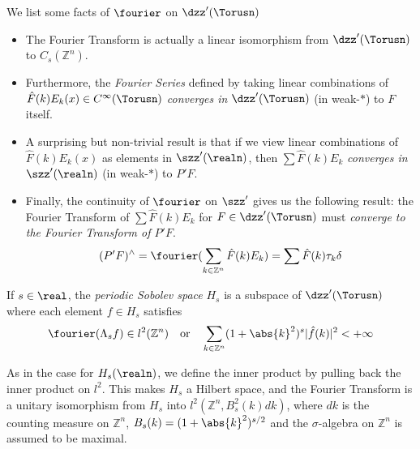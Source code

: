 \documentclass[../main-v2-manifolds.tex]{subfiles}
\begin{document}
We list some facts of $\fourier$ on $\dzz'(\Torusn)$
\begin{itemize}
    \item The Fourier Transform is actually a linear isomorphism from $\dzz'(\Torusn)$ to $C_s(\mathbb{Z}^n)$. 

    \item Furthermore, the \emph{Fourier Series} defined by taking linear combinations of $\hat{F}(k)E_k(x)\in C^\infty(\Torusn)$ \emph{converges in $\dzz'(\Torusn)$} (in weak-$\ast$) to $F$ itself. 
    
    \item A surprising but non-trivial result is that if we view linear combinations of $\hat{F}(k)E_k(x)$ as elements in $\szz'(\realn)$, then $\sum \hat{F}(k)E_k$ \emph{converges in $\szz'(\realn)$} (in weak-$\ast$) to $P'F$.
    
    \item Finally, the continuity of $\fourier$ on $\szz'$ gives us the following result: the Fourier Transform of $\sum \hat{F}(k)E_k$ for $F\in \dzz'(\Torusn)$ must \emph{converge to the Fourier Transform of $P'F$}. 
    \[
    (P'F)^{\wedge} = \fourier(\sum_{k\in\mathbb{Z}^n} \hat{F}(k)E_k) = \sum \hat{F}(k)\tau_k\delta
    \]
\end{itemize}


\begin{definition}\label{def:periodic l2 sobolev space}
If $s\in\real$, the \emph{periodic Sobolev space} $H_s$ is a subspace of $\dzz'(\Torusn)$ where each element $f\in H_s$ satisfies
\[
\fourier(\Lambda_s f)\in l^2(\mathbb{Z}^n)\quad\text{or}\quad \sum_{k\in\mathbb{Z}^n}(1+\abs{k}^2)^s\vert\hat{f}(k)\vert^2< +\infty
\]
\end{definition}
As in the case for $H_s(\realn)$, we define the inner product by pulling back the inner product on $l^2$. This makes $H_s$ a Hilbert space, and the Fourier Transform is a unitary isomorphism from $H_s$ into $l^2(\mathbb{Z}^n, B_s^2(k)dk)$, where $dk$ is the counting measure on $\mathbb{Z}^n$, $B_s(k)=(1+\abs{k}^2)^{s/2}$ and the $\sigma$-algebra on $\mathbb{Z}^n$ is assumed to be maximal. \\
\end{document}
